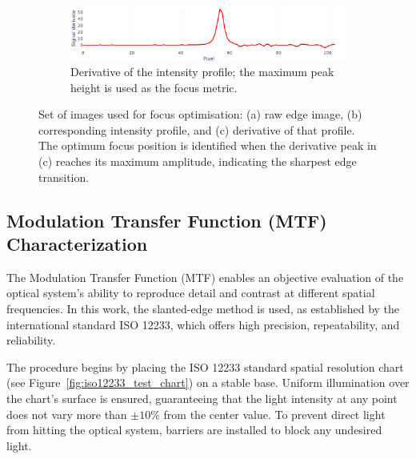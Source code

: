 \begin{figure}[H]
    \vspace{1em} %

    \begin{subfigure}[b]{0.95\linewidth}
        \centering
        \includegraphics[width=\linewidth]{Figures/C3/SE_diff.png}
        \caption{Derivative of the intensity profile; the maximum peak height is used as the focus metric.}
        \label{fig:se_diff}
    \end{subfigure}
    
    \caption{Set of images used for focus optimisation: (a) raw edge image, (b) corresponding intensity profile, and (c) derivative of that profile. The optimum focus position is identified when the derivative peak in (c) reaches its maximum amplitude, indicating the sharpest edge transition.}
    \label{fig:enfoque_conjunta}
\end{figure}


\subsection{Modulation Transfer Function (MTF) Characterization}
\label{sec:mtf_char}
The Modulation Transfer Function (MTF) enables an objective evaluation of the optical system’s ability to reproduce detail and contrast at different spatial frequencies. In this work, the slanted-edge method is used, as established by the international standard ISO 12233, which offers high precision, repeatability, and reliability.

The procedure begins by placing the ISO 12233 standard spatial resolution chart (see Figure~\ref{fig:iso12233_test_chart}) on a stable base. Uniform illumination over the chart’s surface is ensured, guaranteeing that the light intensity at any point does not vary more than $\pm 10\%$ from the center value. To prevent direct light from hitting the optical system, barriers are installed to block any undesired light.

